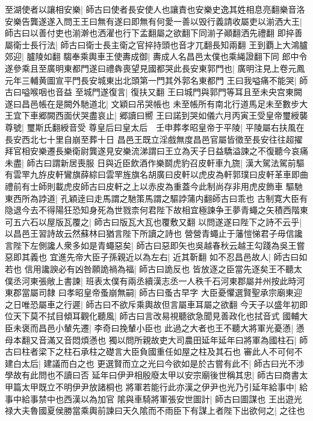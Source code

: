 至湖使者以讓相安樂|{
	師古曰使者長安使人也讓責也安樂史逸其姓相息亮翻樂音洛}
安樂告龔遂遂入問王王曰無有遂曰即無有何愛一善以毁行義請收屬吏以湔洒大王|{
	師古曰以善付吏也湔澣也洒濯也行下孟翻屬之欲翻下同湔子顚翻洒先禮翻}
即捽善屬衛士長行法|{
	師古曰衛士長主衛之官捽持頭也音才兀翻長知兩翻}
王到覇上大鴻臚郊迎|{
	臚陵如翻}
騶奉乘輿車王使夀成御|{
	夀成人名昌邑太僕也乘䋲證翻下同}
郎中令遂參乘且至廣明東都門遂曰禮犇喪望見國都哭此長安東郭門也|{
	廣明注見上卷元鳳元年三輔黄圖宣平門長安城東出北頭第一門其外郭名東都門}
王曰我嗌痛不能哭|{
	師古曰嗌喉咽也音益}
至城門遂復言|{
	復扶又翻}
王曰城門與郭門等耳且至未央宫東闕遂曰昌邑帳在是闕外馳道北|{
	文穎曰吊哭帳也}
未至帳所有南北行道馬足未至數步大王宜下車郷闕西面伏哭盡哀止|{
	郷讀曰嚮}
王曰諾到哭如儀六月丙寅王受皇帝璽綬襲尊號|{
	璽斯氏翻綬音受}
尊皇后曰皇太后　壬申葬孝昭皇帝于平陵|{
	平陵屬右扶風在長安西北七十里自崩至葬十日}
昌邑王既立淫戲無度昌邑官屬皆徵至長安往往超擢拜官相安樂遷長樂衛尉龔遂見安樂流涕謂曰王立為天子日益驕溢諫之不復聽今哀痛未盡|{
	師古曰謂新居喪服}
日與近臣飲酒作樂鬬虎豹召皮軒車九旒|{
	漢大駕法駕前驅有雲䍐九斿皮軒鸞旗薛綜曰雲䍐旌旗名胡廣曰皮軒以虎皮為軒郭璞曰皮軒革車即曲禮前有士師則載虎皮師古曰皮軒之上以赤皮為重蓋今此制尚存非用虎皮飾車}
驅馳東西所為誖道|{
	孔穎逹曰走馬謂之馳策馬謂之驅誖蒲内翻師古曰乖也}
古制寛大臣有隐退今去不得陽狂恐知身死為世戮柰何君陛下故相宜極諫争王夢青蠅之矢積西階東可五六石以屋版瓦覆之|{
	師古曰版瓦大瓦也覆敷又翻}
以問遂遂曰陛下之詩不云乎|{
	以昌邑王習詩故云然蘇林曰猶言陛下所讀之詩也}
營營青蠅止于藩愷悌君子毋信讒言陛下左側讒人衆多如是青蠅惡矣|{
	師古曰惡即矢也吳越春秋云越王勾踐為吳王嘗惡即其義也}
宜進先帝大臣子孫親近以為左右|{
	近其靳翻}
如不忍昌邑故人|{
	師古曰如若也}
信用讒諛必有凶咎願詭禍為福|{
	師古曰詭反也}
皆放逐之臣當先逐矣王不聽太僕丞河東張敞上書諫|{
	班表太僕有兩丞續漢志丞一人秩千石河東郡屬并州按此時河東郡當屬司隸}
曰孝昭皇帝蚤崩無嗣|{
	師古曰蚤古早字}
大臣憂懼選賢聖承宗廟東迎之日唯恐屬車之行遲|{
	師古曰不欲斥乘輿故但言屬車耳屬之欲翻}
今天子以盛年初即位天下莫不拭目傾耳觀化聽風|{
	師古曰言改易視聽欲急聞見善政化也拭音式}
國輔大臣未褒而昌邑小輦先遷|{
	李奇曰挽輦小臣也}
此過之大者也王不聽大將軍光憂懣|{
	懣母本翻又音滿又音悶煩懣也}
獨以問所親故吏大司農田延年延年曰將軍為國柱石|{
	師古曰柱者梁下之柱石承柱之礎言大臣負國重任如屋之柱及其石也}
審此人不可何不建白太后|{
	建議而白之也}
更選賢而立之光曰今欲如是於古嘗有此不|{
	師古曰光不涉學故有此問也不讀曰否}
延年曰伊尹相殷廢太甲以安宗廟後世稱其忠|{
	師古曰商書太甲篇太甲既立不明伊尹放諸桐也}
將軍若能行此亦漢之伊尹也光乃引延年給事中|{
	給事中給事禁中也西漢以為加官}
隂與車騎將軍張安世圖計|{
	師古曰圖謀也}
王出遊光禄大夫魯國夏侯勝當乘輿前諫曰天久隂而不雨臣下有謀上者陛下出欲何之|{
	之往也}
